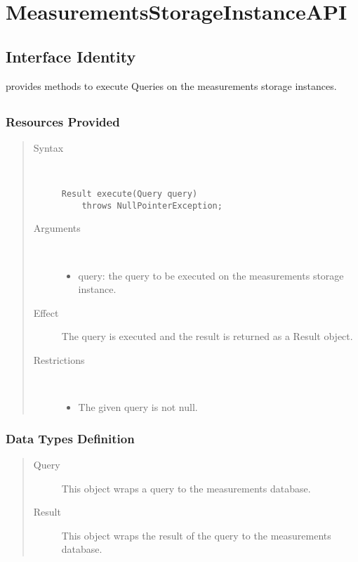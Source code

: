 \section{MeasurementsStorageInstanceAPI}
\label{api:measurements-storage-instance-api}

\subsection{Interface Identity}

\npar {} provides methods to execute
Queries on the measurements storage instances.

\subsection{}

\subsubsection{Resources Provided}

\begin{quote}
	\begin{description}
		\item[Syntax] \ 
		\begin{verbatim}
Result execute(Query query) 
    throws NullPointerException;
		\end{verbatim}
		\item[Arguments] \
		\begin{itemize}
			\item query: the query to be executed on the measurements storage instance. 
		\end{itemize}
		\item[Effect] The query is executed and the result is returned as a Result
		object.
		\item[Restrictions] \ 
		\begin{itemize}
			\item The given query is not null.
		\end{itemize}
	\end{description} 
\end{quote}

\subsubsection{Data Types Definition}

\begin{quote}
	\begin{description}
		\item[Query] This object wraps a query to the measurements database.
		\item[Result] This object wraps the result of the query to the measurements
		database.
	\end{description} 
\end{quote}

